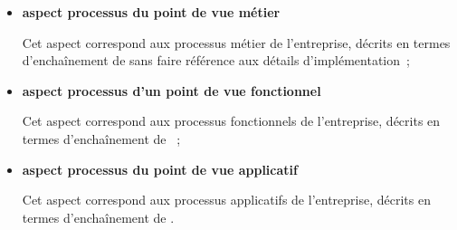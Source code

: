 \begin{itemize}

    \item \textbf{aspect processus du point de vue métier}

Cet aspect correspond aux processus métier de l'entreprise, décrits en termes
d’enchaînement de  sans faire référence aux détails d'implémentation~;

    \item \textbf{aspect processus d'un point de vue fonctionnel}

Cet aspect correspond aux processus fonctionnels de l'entreprise, décrits en termes
d'enchaînement de ~;

    \item \textbf{aspect processus du point de vue applicatif}

Cet aspect correspond aux processus applicatifs de l'entreprise, décrits en termes
d'enchaînement de .

\end{itemize}

